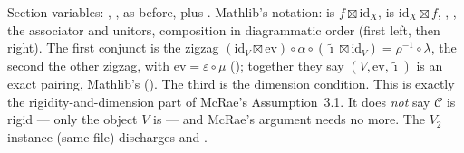 \begin{dictionary}
Section variables: , ,  as before, plus .
Mathlib's notation:  is $f\boxtimes\mathrm{id}_X$,  is $\mathrm{id}_X\boxtimes f$, ,
,  the associator and unitors,  composition in diagrammatic order (first left, then right).
The first conjunct is the zigzag $(\mathrm{id}_V\boxtimes\mathrm{ev})\circ\alpha\circ(\tilde\imath\boxtimes\mathrm{id}_V)
=\rho^{-1}\circ\lambda$, the second the other zigzag, with $\mathrm{ev}=\varepsilon\circ\mu$ ();
together they say $(V,\mathrm{ev},\tilde\imath)$ is an exact pairing, Mathlib's 
(). The third is the dimension condition. This is exactly the rigidity-and-dimension part of
McRae's Assumption~3.1. It does \emph{not} say $\mathcal C$ is rigid --- only the object $V$ is --- and McRae's argument
needs no more. The $V_2$ instance  (same file) discharges  and .
\end{dictionary}

